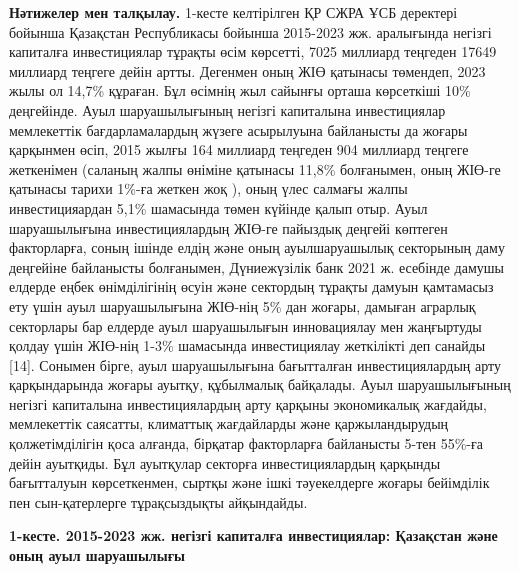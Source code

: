 {{{\bfseries Нәтижелер мен талқылау.} 1-кесте келтірілген ҚР СЖРА ҰСБ
деректері бойынша Қазақстан Республикасы бойынша 2015-2023 жж.
аралығында негізгі капиталға инвестициялар тұрақты өсім көрсетті, 7025
миллиард теңгеден 17649 миллиард теңгеге дейін артты. Дегенмен оның ЖІӨ
қатынасы төмендеп, 2023 жылы ол 14,7\% құраған. Бұл өсімнің жыл сайынғы
орташа көрсеткіші 10\% деңгейінде. Ауыл шаруашылығының негізгі
капиталына инвестициялар мемлекеттік бағдарламалардың жүзеге асырылуына
байланысты да жоғары қарқынмен өсіп, 2015 жылғы 164 миллиард теңгеден
904 миллиард теңгеге жеткенімен (саланың жалпы өніміне қатынасы 11,8\%
болғанымен, оның ЖІӨ-ге қатынасы тарихи 1\%-ға жеткен жоқ ), оның үлес
салмағы жалпы инвестицияардан 5,1\% шамасында төмен күйінде қалып отыр.
Ауыл шаруашылығына инвестициялардың ЖІӨ-ге пайыздық деңгейі көптеген
факторларға, соның ішінде елдің және оның ауылшаруашылық секторының даму
деңгейіне байланысты болғанымен, Дүниежүзілік банк 2021 ж. есебінде
дамушы елдерде еңбек өнімділігінің өсуін және сектордың тұрақты дамуын
қамтамасыз ету үшін ауыл шаруашылығына ЖІӨ-нің 5\% дан жоғары, дамыған
аграрлық секторлары бар елдерде ауыл шаруашылығын инновациялау мен
жаңғыртуды қолдау үшін ЖІӨ-нің 1-3\% шамасында инвестициялау жеткілікті
деп санайды {[}14{]}. Сонымен бірге, ауыл шаруашылығына бағытталған
инвестициялардың арту қарқындарында жоғары ауытқу, құбылмалық байқалады.
Ауыл шаруашылығының негізгі капиталына инвестициялардың арту қарқыны
экономикалық жағдайды, мемлекеттік саясатты, климаттық жағдайларды және
қаржыландырудың қолжетімділігін қоса алғанда, бірқатар факторларға
байланысты 5-тен 55\%-ға дейін ауытқиды. Бұл ауытқулар секторға
инвестициялардың қарқынды бағытталуын көрсеткенмен, сыртқы және ішкі
тәуекелдерге жоғары бейімділік пен сын-қатерлерге тұрақсыздықты
айқындайды.

{\bfseries 1-кесте. 2015-2023 жж. негізгі капиталға инвестициялар:
Қазақстан және оның ауыл шаруашылығы}

}}
